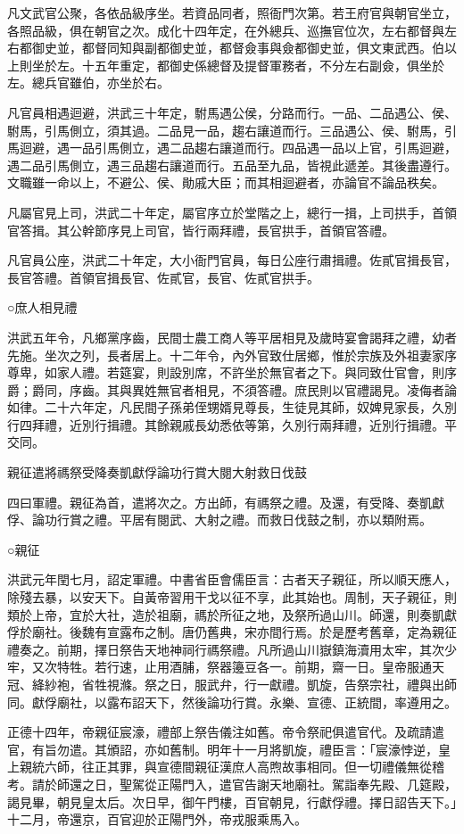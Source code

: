 凡文武官公聚，各依品級序坐。若資品同者，照衙門次第。若王府官與朝官坐立，各照品級，俱在朝官之次。成化十四年定，在外總兵、巡撫官位次，左右都督與左右都御史並，都督同知與副都御史並，都督僉事與僉都御史並，俱文東武西。伯以上則坐於左。十五年重定，都御史係總督及提督軍務者，不分左右副僉，俱坐於左。總兵官雖伯，亦坐於右。

凡官員相遇迴避，洪武三十年定，駙馬遇公侯，分路而行。一品、二品遇公、侯、駙馬，引馬側立，須其過。二品見一品，趨右讓道而行。三品遇公、侯、駙馬，引馬迴避，遇一品引馬側立，遇二品趨右讓道而行。四品遇一品以上官，引馬迴避，遇二品引馬側立，遇三品趨右讓道而行。五品至九品，皆視此遞差。其後盡遵行。文職雖一命以上，不避公、侯、勛戚大臣；而其相迴避者，亦論官不論品秩矣。

凡屬官見上司，洪武二十年定，屬官序立於堂階之上，總行一揖，上司拱手，首領官答揖。其公幹節序見上司官，皆行兩拜禮，長官拱手，首領官答禮。

凡官員公座，洪武二十年定，大小衙門官員，每日公座行肅揖禮。佐貳官揖長官，長官答禮。首領官揖長官、佐貳官，長官、佐貳官拱手。

○庶人相見禮

洪武五年令，凡鄉黨序齒，民間士農工商人等平居相見及歲時宴會謁拜之禮，幼者先施。坐次之列，長者居上。十二年令，內外官致仕居鄉，惟於宗族及外祖妻家序尊卑，如家人禮。若筵宴，則設別席，不許坐於無官者之下。與同致仕官會，則序爵；爵同，序齒。其與異姓無官者相見，不須答禮。庶民則以官禮謁見。凌侮者論如律。二十六年定，凡民間子孫弟侄甥婿見尊長，生徒見其師，奴婢見家長，久別行四拜禮，近別行揖禮。其餘親戚長幼悉依等第，久別行兩拜禮，近別行揖禮。平交同。

親征遣將禡祭受降奏凱獻俘論功行賞大閱大射救日伐鼓

四曰軍禮。親征為首，遣將次之。方出師，有禡祭之禮。及還，有受降、奏凱獻俘、論功行賞之禮。平居有閱武、大射之禮。而救日伐鼓之制，亦以類附焉。

○親征

洪武元年閏七月，詔定軍禮。中書省臣會儒臣言：古者天子親征，所以順天應人，除殘去暴，以安天下。自黃帝習用干戈以征不享，此其始也。周制，天子親征，則類於上帝，宜於大社，造於祖廟，禡於所征之地，及祭所過山川。師還，則奏凱獻俘於廟社。後魏有宣露布之制。唐仍舊典，宋亦間行焉。於是歷考舊章，定為親征禮奏之。前期，擇日祭告天地神祠行禡祭禮。凡所過山川嶽鎮海瀆用太牢，其次少牢，又次特牲。若行速，止用酒脯，祭器籩豆各一。前期，齋一日。皇帝服通天冠、絳紗袍，省牲視滌。祭之日，服武弁，行一獻禮。凱旋，告祭宗社，禮與出師同。獻俘廟社，以露布詔天下，然後論功行賞。永樂、宣德、正統間，率遵用之。

正德十四年，帝親征宸濠，禮部上祭告儀注如舊。帝令祭祀俱遣官代。及疏請遣官，有旨勿遣。其頒詔，亦如舊制。明年十一月將凱旋，禮臣言：「宸濠悖逆，皇上親統六師，往正其罪，與宣德間親征漢庶人高煦故事相同。但一切禮儀無從稽考。請於師還之日，聖駕從正陽門入，遣官告謝天地廟社。駕詣奉先殿、几筵殿，謁見畢，朝見皇太后。次日早，御午門樓，百官朝見，行獻俘禮。擇日詔告天下。」十二月，帝還京，百官迎於正陽門外，帝戎服乘馬入。

